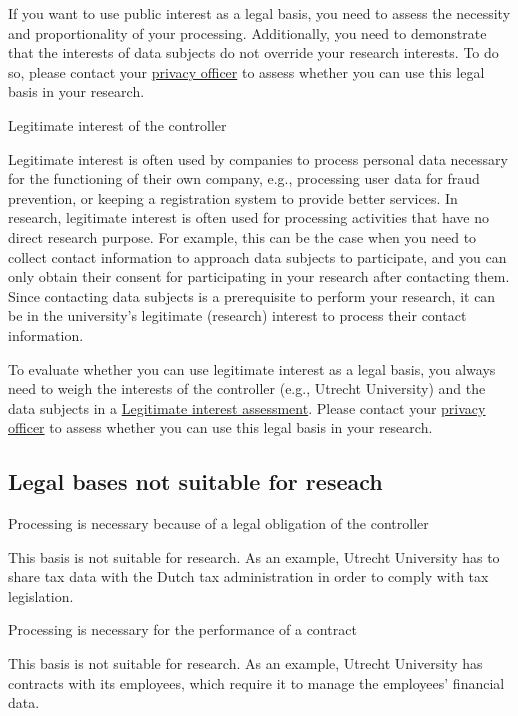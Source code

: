 \documentclass[
]{book}
\begin{document}
If you want to use public interest as a legal basis, you
need to assess the necessity and proportionality of your processing.
Additionally, you need to demonstrate that the interests of data
subjects do not override your research interests. To do so, please contact
your \protect\hyperlink{support}{privacy officer} to assess whether you can use this
legal basis in your research.

Legitimate interest of the controller

Legitimate interest is often used by companies to process personal data
necessary for the functioning of their own company, e.g., processing
user data for fraud prevention, or keeping a registration system to
provide better services. In research, legitimate interest is often used
for processing activities that have no direct research purpose. For
example, this can be the case when you need to collect contact
information to approach data subjects to participate, and you can only
obtain their consent for participating in your research after contacting
them. Since contacting data subjects is a prerequisite to perform your
research, it can be in the university's legitimate (research) interest
to process their contact information.

To evaluate whether you can use legitimate interest as a legal basis, you
always need to weigh the interests of the controller (e.g., Utrecht
University) and the data subjects in a
\protect\hyperlink{legitimate-interest-assessment}{Legitimate interest assessment}.
Please contact your \protect\hyperlink{support}{privacy officer} to assess whether you
can use this legal basis in your research.

\hypertarget{legal-bases-not-suitable-for-reseach}{%
\subsection{Legal bases not suitable for reseach}\label{legal-bases-not-suitable-for-reseach}}

Processing is necessary because of a legal obligation of the controller

This basis is not suitable for research. As an example, Utrecht
University has to share tax data with the Dutch tax administration in
order to comply with tax legislation.

Processing is necessary for the performance of a contract

This basis is not suitable for research. As an example, Utrecht
University has contracts with its employees, which require it to manage
the employees' financial data.
\end{document}
